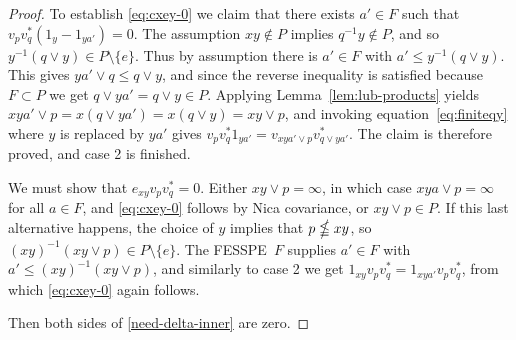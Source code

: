 \documentclass[12pt]{amsart}
\theoremstyle{plain}
\theoremstyle{remark}
\theoremstyle{definition}
\numberwithin{equation}{section}
\theoremstyle{plain}
\theoremstyle{definition}
\theoremstyle{remark}
\begin{document}
\begin{proof}
To establish \eqref{eq:cxey-0} we claim that there exists $a'\in F$ such that
$v_pv_q^*(1_y-1_{ya'})=0$.  The assumption $xy\notin P$ implies $q^{-1}y\notin P$,
and so $y^{-1}(q\vee y)\in P\setminus \{e\}$. Thus by assumption there is $a'\in F$ with
$a'\leq y^{-1}(q\vee y)$. This gives $ya'\vee q\leq q\vee y$, and since the reverse inequality is satisfied because $F\subset P$ we get $q\vee ya'= q\vee y\in P$. Applying
Lemma~\ref{lem:lub-products} yields $xya'\vee p=x(q\vee ya')=x(q\vee y)=xy\vee p$,
and invoking equation~\eqref{eq:finiteqy} where $y$ is replaced by $ya'$ gives
$v_pv_q^*1_{ya'}=v_{xya'\vee p}v^*_{q\vee ya'}$. The claim is therefore proved, and case 2
is finished.

\smallskip
{} We must show that $e_{xy}v_pv_ q^*=0$.
Either $xy\vee p=\infty$, in which case $xya\vee p=\infty$ for all $a\in F$, and
\eqref{eq:cxey-0} follows by Nica covariance, or $xy\vee p\in P$. If this
last alternative happens, the
choice of $y$ implies that $p\nleqq xy$,  so $(xy)^{-1}(xy\vee p)\in P\setminus \{e\}$.
The {FESSPE}\ $F$ supplies $a'\in F$ with $a'\leq (xy)^{-1}(xy\vee p)$, and similarly
to case 2 we get $1_{xy}v_pv_q^*=1_{xya'}v_pv_q^*$, from which \eqref{eq:cxey-0} again follows.

\smallskip
{} Then both sides of
\eqref{need-delta-inner}  are zero.
\end{proof}
\end{document}
